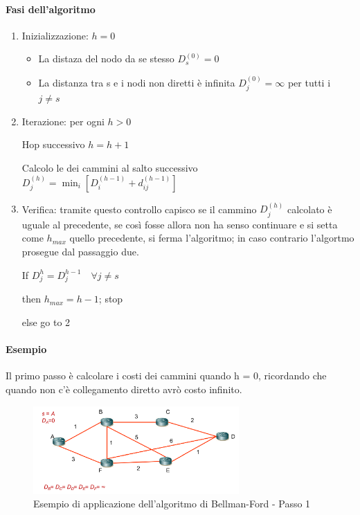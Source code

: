 \paragraph{Fasi dell'algoritmo}
\begin{enumerate}
    \item Inizializzazione: $h = 0$
    \begin{itemize}
        \item La distaza del nodo da se stesso $D_s^{(0)} = 0$
        \item La distanza tra s e i nodi non diretti è infinita $D_j^{(0)} = \infty$ per tutti i $j \neq s$
    \end{itemize}
    \item Iterazione: per ogni $h > 0$

    Hop successivo $h = h + 1$ 

    Calcolo le dei cammini al salto successivo $D_j^{(h)} = \min_i [D_i^{(h-1)} + d_{ij}^{(h-1)}]$

     \item Verifica: tramite questo controllo capisco se il cammino $D_j^{(h)}$ calcolato è uguale al precedente, se così fosse allora non ha senso continuare e si setta come $h_{max}$ quello precedente, si ferma l'algoritmo; in caso contrario l'algortmo prosegue dal passaggio due. 
     
    If $D_j^{h} = D_j^{h-1} \quad \forall j \neq s$
    
    then $h_{max} = h - 1$; stop
    
    else go to 2
\end{enumerate}
\newpage
\paragraph{Esempio}

Il primo passo è calcolare i costi dei cammini quando h = 0, ricordando che quando non c'è collegamento diretto avrò costo infinito.

\begin{figure}[h!]
    \centering
    \includegraphics[width=0.7\textwidth]{images/bf1.png}
    \caption{Esempio di applicazione dell'algoritmo di Bellman-Ford - Passo 1}
    \label{fig:bf1}
\end{figure}

